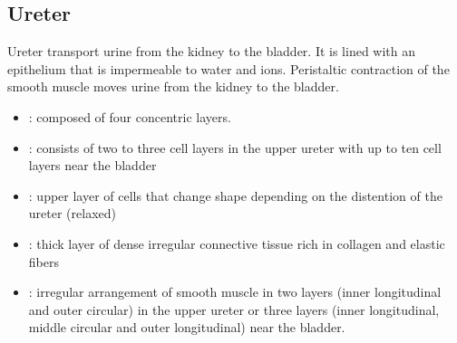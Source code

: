 \subsection{Ureter}
Ureter transport urine from the kidney to the bladder. It is lined with an epithelium that is impermeable to water and ions. Peristaltic contraction of the smooth muscle moves urine from the kidney to the bladder.

\begin{center}
\end{center}
\begin{multicols}{2}
\begin{itemize}
  \item {}: composed of four concentric layers.
  
  \begin{center}
  \end{center}
  
  \item {}: consists of two to three cell layers in the upper ureter with up to ten cell layers near the bladder 
  
  \begin{center}
  \end{center}
  
  \item {}: upper layer of cells that change shape depending on the distention of the ureter (relaxed)
  
  \begin{center}
  \end{center}
  
  \item {}: thick layer of dense irregular connective tissue rich in collagen and elastic fibers 
  
  \begin{center}
  \end{center}
  
  \item {}: irregular arrangement of smooth muscle in two layers (inner longitudinal and outer circular) in the upper ureter or three layers (inner longitudinal, middle circular and outer longitudinal) near the bladder.
  

\end{itemize}
\end{multicols}
